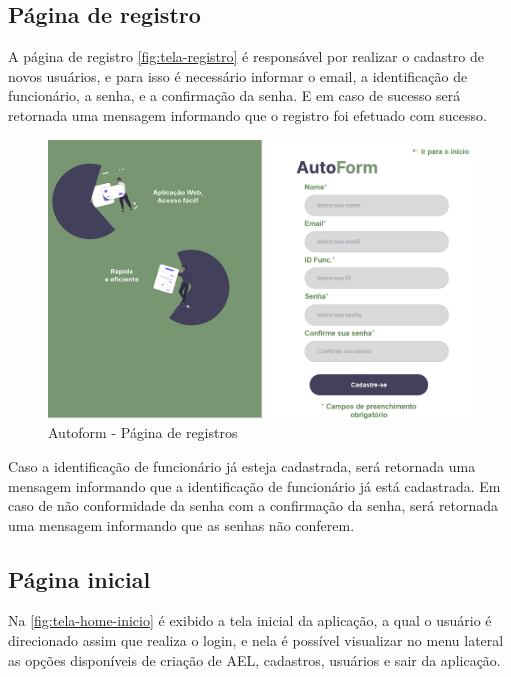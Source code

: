 \subsection{Página de registro}
A página de registro \autoref{fig:tela-registro} é responsável por realizar o cadastro de novos usuários, e para isso é necessário informar o email, a identificação de funcionário, a senha, e a confirmação da senha. E em caso de sucesso será retornada uma mensagem informando que o registro foi efetuado com sucesso.

\begin{figure}[htb]
    \caption{\label{fig:tela-registro}Autoform - Página de registros}
    \begin{center}
        \includegraphics[scale=0.6]{imagens/registro-autoform.png}   
     \end{center}
\end{figure}
Caso a identificação de funcionário já esteja cadastrada, será retornada uma mensagem informando que a identificação de funcionário já está cadastrada.
Em caso de não conformidade da senha com a confirmação da senha, será retornada uma mensagem informando que as senhas não conferem.

\subsection{Página inicial}
Na \autoref{fig:tela-home-inicio} é exibido a tela inicial da aplicação, a qual o usuário é direcionado assim que realiza o login, e nela é possível visualizar no menu lateral as opções disponíveis de criação de AEL, cadastros, usuários e sair da aplicação.

